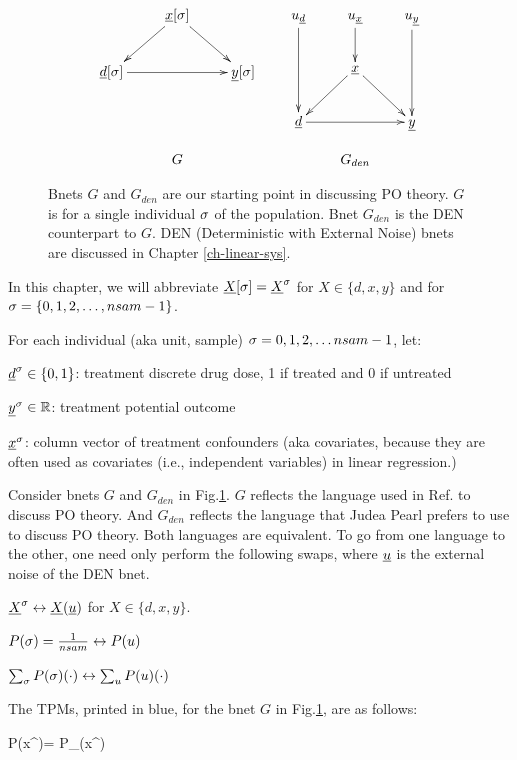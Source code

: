 \begin{figure}[h!]
$$
\begin{array}{ccc}
\xymatrix{
&\rvx\sqsig\ar[dl]\ar[dr]
\\
\rvd\sqsig\ar[rr]&&\rvy\sqsig
}
&&
\xymatrix{
u_\rvd\ar[dd]&u_\rvx\ar[d]&u_\rvy\ar[dd]
\\
&\rvx\ar[dl]\ar[dr]
\\
\rvd\ar[rr]&&\rvy
}
\\
\\
G&&G_{den}
\end{array}
$$
\caption{Bnets
$G$ and $G_{den}$
are 
our starting
point in discussing PO theory. 
 $G$ is for 
a single individual $\sigma$ of the 
population.
Bnet $G_{den}$ is the 
DEN counterpart 
to $G$.
DEN (Deterministic with
External Noise) bnets are discussed in Chapter
\ref{ch-linear-sys}.} 
\label{fig-po-G-start}
\end{figure}

In this chapter, we will
abbreviate
${\underline{X}}{[\sigma]}={\underline{X}}^\sigma$
for
$X\in \{d, x, y\}$ 
and for $\sigma=\{0,1,2, \ldots, nsam-1\}$.


For each individual (aka unit, sample) 
$\sigma=0, 1, 2, \ldots nsam-1$, let:

${\underline{d}}^\sigma\in\{0,1\}$: treatment discrete drug dose,  1 if treated and 0 if untreated

${\underline{y}}^\sigma\in { \mathbb{R}}$:
 treatment potential outcome

${\underline{x}}^\sigma$: column vector of treatment 
confounders 
(aka covariates, because they
are often used as covariates (i.e., 
independent
variables) in linear regression.)

Consider bnets $G$ and $G_{den}$
in 
 Fig.\ref{fig-po-G-start}.
$G$ reflects the language
used in Ref.\cite{book-mixtape}
to discuss PO theory. And
$G_{den}$ reflects
the language that Judea Pearl 
prefers to use to discuss PO theory.
Both languages are equivalent. To go from
one language to the other, one need only
perform the following
swaps, where ${\underline{u}}$
is the external noise of the DEN bnet.

${\underline{X}}^\sigma\leftrightarrow {\underline{X}}({\underline{u}})$
for $X\in \{d, x, y\}$.

$P(\sigma)=\frac{1}{nsam}\leftrightarrow P(u)$

$\sum_\sigma P(\sigma) (\cdot)
\leftrightarrow \sum_uP(u) (\cdot)$




The TPMs, printed in blue,
for the bnet
$G$
in Fig.\ref{fig-po-G-start},
are as follows:


\beq\color{blue}
P(x^\s)=
P_{\rvx}(x^\s)
\eeq

